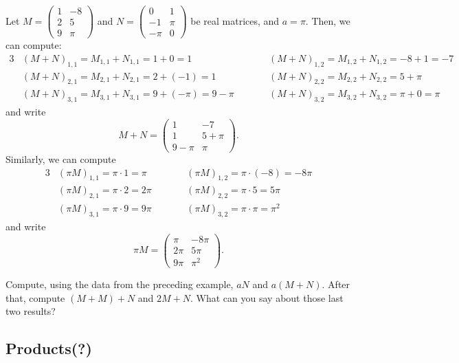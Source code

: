 \begin{ex}
	Let $M=\begin{pmatrix}
	1 & -8\\
	2 & 5\\
	9 & \pi
	\end{pmatrix}$ and $N=\begin{pmatrix}
	0 & 1\\
	-1 & \pi\\
	-\pi &0
	\end{pmatrix}$ be real matrices, and $a=\pi$. Then, we can compute:
	\begin{alignat*}{3}
	&(M+N)_{1,1}=M_{1,1}+N_{1,1}=1+0=1\quad&\quad&(M+N)_{1,2}=M_{1,2}+N_{1,2}=-8+1=-7\\
	&(M+N)_{2,1}=M_{2,1}+N_{2,1}=2+(-1)=1\quad&\quad&(M+N)_{2,2}=M_{2,2}+N_{2,2}=5+\pi\\
	&(M+N)_{3,1}=M_{3,1}+N_{3,1}=9+(-\pi)=9-\pi\quad&\quad&(M+N)_{3,2}=M_{3,2}+N_{3,2}=\pi+0=\pi
	\end{alignat*}and write
	\[M+N=\begin{pmatrix}
	1 & -7\\
	1 & 5+\pi\\
	9-\pi & \pi
	\end{pmatrix}.\]
	\tcblower
	Similarly, we can compute
	\begin{alignat*}{3}
	&(\pi M)_{1,1}=\pi\cdot 1=\pi\quad&\quad &(\pi M)_{1,2}=\pi\cdot (-8)=-8\pi\\
	&(\pi M)_{2,1}=\pi\cdot 2 = 2\pi\quad&\quad &(\pi M)_{2,2}=\pi\cdot 5 = 5\pi\\
	&(\pi M)_{3,1}=\pi\cdot 9 = 9\pi\quad&\quad 	&(\pi M)_{3,2}=\pi\cdot \pi=\pi^2
	\end{alignat*}and write
	\[\pi M=\begin{pmatrix}
	\pi & -8\pi\\
	2\pi & 5\pi\\
	9\pi &\pi^2
	\end{pmatrix}.\]
\end{ex}

\begin{exerc}
	Compute, using the data from the preceding example, $aN$ and $a(M+N)$. After that, compute $(M+M)+N$ and $2M+N$. What can you say about those last two results?
\end{exerc}

\subsection{Products(?)}

